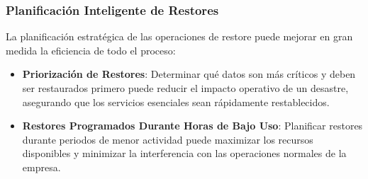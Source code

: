 \subsubsection{Planificación Inteligente de Restores}

La planificación estratégica de las operaciones de restore puede mejorar en gran medida la eficiencia de todo el proceso:

\begin{itemize}
    \item \textbf{Priorización de Restores}: Determinar qué datos son más críticos y deben ser restaurados primero puede reducir el impacto operativo de un desastre, asegurando que los servicios esenciales sean rápidamente restablecidos.
    \item \textbf{Restores Programados Durante Horas de Bajo Uso}: Planificar restores durante periodos de menor actividad puede maximizar los recursos disponibles y minimizar la interferencia con las operaciones normales de la empresa.
\end{itemize}

